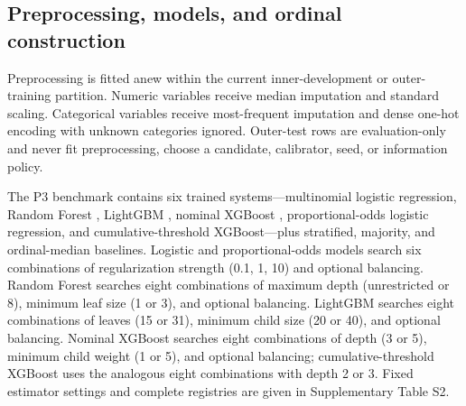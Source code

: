 \documentclass[information,article,submit,pdftex,moreauthors]{Definitions/mdpi}
\begin{document}
\begin{table}[H]
\centering\scriptsize
\caption{P0–P5 information policies}
\label{tab:2}
\end{table}

\subsection{Preprocessing, models, and ordinal construction}

Preprocessing is fitted anew within the current inner-development or outer-training partition. Numeric variables receive median imputation and standard scaling. Categorical variables receive most-frequent imputation and dense one-hot encoding with unknown categories ignored. Outer-test rows are evaluation-only and never fit preprocessing, choose a candidate, calibrator, seed, or information policy.

The P3 benchmark contains six trained systems—multinomial logistic regression, Random Forest \cite{breiman2001random}, LightGBM \cite{ke2017lightgbm}, nominal XGBoost \cite{chen2016xgboost}, proportional-odds logistic regression, and cumulative-threshold XGBoost—plus stratified, majority, and ordinal-median baselines. Logistic and proportional-odds models search six combinations of regularization strength (0.1, 1, 10) and optional balancing. Random Forest searches eight combinations of maximum depth (unrestricted or 8), minimum leaf size (1 or 3), and optional balancing. LightGBM searches eight combinations of leaves (15 or 31), minimum child size (20 or 40), and optional balancing. Nominal XGBoost searches eight combinations of depth (3 or 5), minimum child weight (1 or 5), and optional balancing; cumulative-threshold XGBoost uses the analogous eight combinations with depth 2 or 3. Fixed estimator settings and complete registries are given in Supplementary Table S2.
\end{document}
